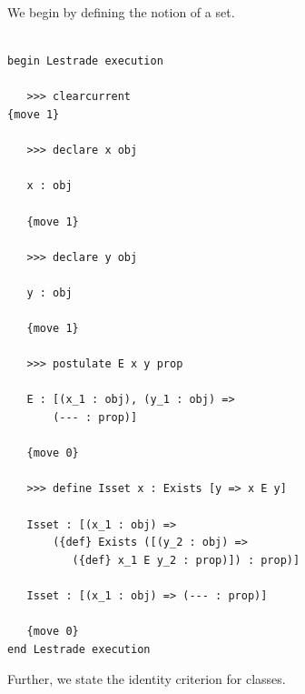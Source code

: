 \documentclass[12pt]{article}
\begin{document}
We begin by defining the notion of a set.

\begin{verbatim}

begin Lestrade execution

   >>> clearcurrent
{move 1}

   >>> declare x obj

   x : obj

   {move 1}

   >>> declare y obj

   y : obj

   {move 1}

   >>> postulate E x y prop

   E : [(x_1 : obj), (y_1 : obj) => 
       (--- : prop)]

   {move 0}

   >>> define Isset x : Exists [y => x E y]

   Isset : [(x_1 : obj) => 
       ({def} Exists ([(y_2 : obj) => 
          ({def} x_1 E y_2 : prop)]) : prop)]

   Isset : [(x_1 : obj) => (--- : prop)]

   {move 0}
end Lestrade execution

\end{verbatim}

Further, we state the identity criterion for classes.
\end{document}
